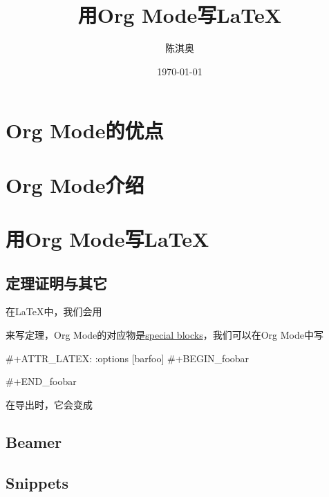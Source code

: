 \documentclass[11pt]{article}
\author{陈淇奥}
\date{\today}
\title{用Org Mode写\LaTeX}
\begin{document}
\maketitle
\tableofcontents



\section{Org Mode的优点}
\label{sec:orga64a68a}

\section{Org Mode介绍}
\label{sec:orgab0cf66}

\section{用Org Mode写\LaTeX}
\label{sec:org24e1c5d}

\subsection{定理证明与其它}
\label{sec:orgc837da8}

在\LaTeX 中，我们会用
\begin{theorem}[Morley定理]
\end{theorem}

来写定理，Org Mode的对应物是\href{https://orgmode.org/worg/org-contrib/org-special-blocks.html}{special blocks}，我们可以在Org Mode中写

#+ATTR_LATEX: :options [barfoo]
#+BEGIN_foobar

#+END_foobar

在导出时，它会变成
\begin{foobar}[barfoo]

\end{foobar}

\subsection{Beamer}
\label{sec:org46db145}
\subsection{Snippets}
\label{sec:org765d280}
\end{document}
